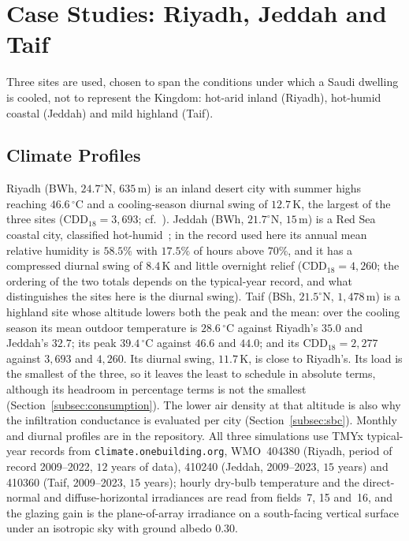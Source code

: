 \documentclass[3p,twocolumn,number]{elsarticle}
\begin{document}
\section{Case Studies: Riyadh, Jeddah and Taif}
\label{sec:casestudy}

Three sites are used, chosen to span the conditions under which a Saudi dwelling is cooled, not to represent the Kingdom: hot-arid inland (Riyadh), hot-humid coastal (Jeddah) and mild highland (Taif).
 
\subsection{Climate Profiles}
\label{subsec:climate}
 
Riyadh (BWh, $24.7^\circ$N, $635\,$m) is an inland desert city with summer highs reaching $46.6\,^\circ$C and a cooling-season diurnal swing of $12.7\,$K, the largest of the three sites (CDD$_{18}=3{,}693$; cf.~\cite{Haddad2024}). Jeddah (BWh, $21.7^\circ$N, $15\,$m) is a Red Sea coastal city, classified hot-humid~\cite{Rodrigues2025}; in the record used here its annual mean relative humidity is $58.5\%$ with $17.5\%$ of hours above $70\%$, and it has a compressed diurnal swing of $8.4\,$K and little overnight relief (CDD$_{18}=4{,}260$; the ordering of the two totals depends on the typical-year record, and what distinguishes the sites here is the diurnal swing). Taif (BSh, $21.5^\circ$N, $1{,}478\,$m) is a highland site whose altitude lowers both the peak and the mean: over the cooling season its mean outdoor temperature is $28.6\,^\circ$C against Riyadh's $35.0$ and Jeddah's $32.7$; its peak $39.4\,^\circ$C against $46.6$ and $44.0$; and its CDD$_{18}=2{,}277$ against $3{,}693$ and $4{,}260$. Its diurnal swing, $11.7\,$K, is close to Riyadh's. Its load is the smallest of the three, so it leaves the least to schedule in absolute terms, although its headroom in percentage terms is not the smallest (Section~\ref{subsec:consumption}). The lower air density at that altitude is also why the infiltration conductance is evaluated per city (Section~\ref{subsec:sbc}). Monthly and diurnal profiles are in the repository. All three simulations use TMYx typical-year records from \texttt{climate.onebuilding.org}, WMO~404380 (Riyadh, period of record 2009--2022, $12$ years of data), 410240 (Jeddah, 2009--2023, $15$ years) and 410360 (Taif, 2009--2023, $15$ years); hourly dry-bulb temperature and the direct-normal and diffuse-horizontal irradiances are read from fields~7, 15 and~16, and the glazing gain is the plane-of-array irradiance on a south-facing vertical surface under an isotropic sky with ground albedo $0.30$.
 
\end{document}

